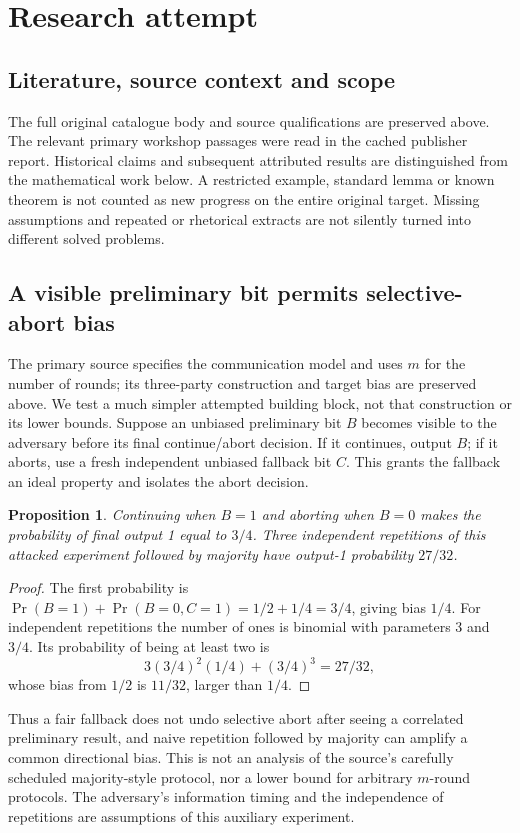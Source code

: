 \documentclass[11pt]{article}
\newtheorem{proposition}{Proposition}
\begin{document}
\section{Research attempt}
\subsection{Literature, source context and scope}
The full original catalogue body and source qualifications are preserved above. The relevant primary workshop passages were read in the cached publisher report. Historical claims and subsequent attributed results are distinguished from the mathematical work below. A restricted example, standard lemma or known theorem is not counted as new progress on the entire original target. Missing assumptions and repeated or rhetorical extracts are not silently turned into different solved problems.

\subsection{A visible preliminary bit permits selective-abort bias}
The primary source specifies the communication model and uses $m$ for the number of rounds; its three-party construction and target bias are preserved above. We test a much simpler attempted building block, not that construction or its lower bounds. Suppose an unbiased preliminary bit $B$ becomes visible to the adversary before its final continue/abort decision. If it continues, output $B$; if it aborts, use a fresh independent unbiased fallback bit $C$. This grants the fallback an ideal property and isolates the abort decision.
\begin{proposition}
Continuing when $B=1$ and aborting when $B=0$ makes the probability of final output 1 equal to $3/4$. Three independent repetitions of this attacked experiment followed by majority have output-1 probability $27/32$.
\end{proposition}
\begin{proof}
The first probability is $\Pr(B=1)+\Pr(B=0,C=1)=1/2+1/4=3/4$, giving bias $1/4$. For independent repetitions the number of ones is binomial with parameters 3 and $3/4$. Its probability of being at least two is
\[
3(3/4)^2(1/4)+(3/4)^3=27/32,
\]
whose bias from $1/2$ is $11/32$, larger than $1/4$.
\end{proof}
Thus a fair fallback does not undo selective abort after seeing a correlated preliminary result, and naive repetition followed by majority can amplify a common directional bias. This is not an analysis of the source's carefully scheduled majority-style protocol, nor a lower bound for arbitrary $m$-round protocols. The adversary's information timing and the independence of repetitions are assumptions of this auxiliary experiment.
\end{document}
